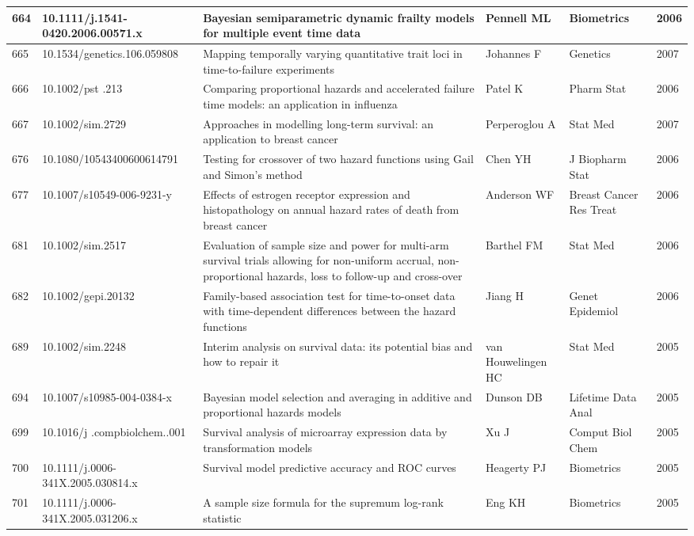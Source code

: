 \begin{landscape}
\begin{longtable}{|p{0.3in}|p{1.8in}|p{2.4in}|p{0.68in}|p{0.89in}|p{0.3in}|}
664 & 10.1111/j.1541-0420.2006.00571.x      & Bayesian semiparametric dynamic frailty models for multiple event time data & Pennell ML & Biometrics & 2006 \\ \hline 
665 & 10.1534/genetics.106.059808      & Mapping temporally varying quantitative trait loci in time-to-failure experiments & Johannes F & Genetics & 2007 \\ \hline 
666 & 10.1002/pst   .213 & Comparing proportional hazards and accelerated failure time models: an application in influenza & Patel K & Pharm Stat & 2006 \\ \hline 
667 & 10.1002/sim.2729     & Approaches in modelling long-term survival: an application to breast cancer & Perperoglou A & Stat Med & 2007 \\ \hline 
676 & 10.1080/10543400600614791     & Testing for crossover of two hazard functions using Gail and Simon's method & Chen YH & J Biopharm Stat & 2006 \\ \hline 
677 & 10.1007/s10549-006-9231-y     & Effects of estrogen receptor expression and histopathology on annual hazard rates of death from breast cancer & Anderson WF & Breast Cancer Res Treat & 2006 \\ \hline 
681 & 10.1002/sim.2517     & Evaluation of sample size and power for multi-arm survival trials allowing for non-uniform accrual, non-proportional hazards, loss to follow-up and cross-over & Barthel FM & Stat Med & 2006 \\ \hline 
682 & 10.1002/gepi.20132   & Family-based association test for time-to-onset data with time-dependent differences between the hazard functions & Jiang H & Genet Epidemiol & 2006 \\ \hline 
689 & 10.1002/sim.2248     & Interim analysis on survival data: its potential bias and how to repair it & van Houwelingen HC & Stat Med & 2005 \\ \hline 
694 & 10.1007/s10985-004-0384-x     & Bayesian model selection and averaging in additive and proportional hazards models & Dunson DB & Lifetime Data Anal & 2005 \\ \hline 
699 & 10.1016/j    .compbiolchem.\-2005.02.001 & Survival analysis of microarray expression data by transformation models & Xu J & Comput Biol Chem & 2005 \\ \hline 
700 & 10.1111/j.0006-341X.2005.030814.x     & Survival model predictive accuracy and ROC curves & Heagerty PJ & Biometrics & 2005 \\ \hline 
701 & 10.1111/j.0006-341X.2005.031206.x     & A sample size formula for the supremum log-rank statistic & Eng KH & Biometrics & 2005 \\ \hline 

\end{longtable}
\end{landscape}
